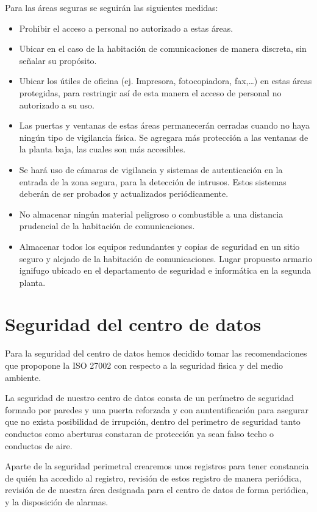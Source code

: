 \documentclass[11pt,bibtotoc,noliststotoc,BCOR0mm]{scrbook}
\begin{document}
Para las áreas seguras se seguirán las siguientes medidas:
\begin{itemize}
\item Prohibir el acceso a personal no autorizado a estas áreas.
\item Ubicar en el caso de la habitación de comunicaciones de manera discreta, sin señalar su propósito.
\item Ubicar los útiles de oficina (ej. Impresora, fotocopiadora, fax,…) en estas áreas protegidas, para restringir así de esta manera el acceso de personal no autorizado a su uso.
\item Las puertas y ventanas de estas áreas permanecerán cerradas cuando no haya ningún tipo de vigilancia física. Se agregara más protección a las ventanas de la planta baja, las cuales son más accesibles.
\item Se hará uso  de cámaras de vigilancia y sistemas de autenticación en la entrada de la zona segura, para la detección de intrusos. Estos sistemas deberán de ser probados y actualizados periódicamente.
\item No almacenar ningún material peligroso o combustible a una distancia prudencial de la habitación de comunicaciones. 
\item Almacenar todos los equipos redundantes y copias de seguridad en un sitio seguro y alejado de la habitación de comunicaciones. Lugar propuesto armario ignifugo ubicado en el departamento de seguridad e informática en la segunda planta.

\end{itemize}

\section{Seguridad del centro de datos}

Para la seguridad del centro de datos hemos decidido tomar las recomendaciones que propopone la ISO 27002 con respecto a la seguridad fisica y del medio ambiente.

La seguridad de nuestro centro de datos consta de un perímetro de seguridad formado por paredes y una puerta reforzada y con auntentificación para asegurar que no exista posibilidad de irrupción, dentro del perimetro de seguridad tanto conductos como aberturas constaran de protección ya sean falso techo o conductos de aire.

Aparte de la seguridad perimetral crearemos unos registros para tener constancia de quién ha accedido al registro, revisión de estos registro de manera periódica,  revisión de de nuestra área designada para el centro de datos de forma periódica, y la disposición de alarmas.
\end{document}
